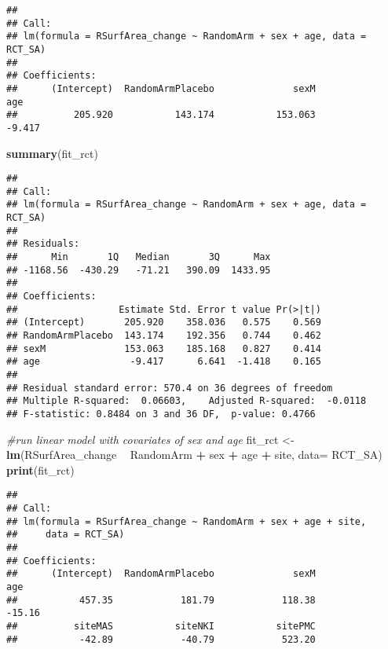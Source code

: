 \documentclass[]{article}
\newenvironment{Shaded}{\begin{snugshade}}{\end{snugshade}}
\newcommand{\KeywordTok}[1]{\textcolor[rgb]{0.13,0.29,0.53}{\textbf{#1}}}
\newcommand{\DataTypeTok}[1]{\textcolor[rgb]{0.13,0.29,0.53}{#1}}
\newcommand{\StringTok}[1]{\textcolor[rgb]{0.31,0.60,0.02}{#1}}
\newcommand{\CommentTok}[1]{\textcolor[rgb]{0.56,0.35,0.01}{\textit{#1}}}
\newcommand{\OperatorTok}[1]{\textcolor[rgb]{0.81,0.36,0.00}{\textbf{#1}}}
\newcommand{\NormalTok}[1]{#1}
\theoremstyle{definition}
\theoremstyle{definition}
\theoremstyle{definition}
\theoremstyle{remark}
\begin{document}
\begin{verbatim}
## 
## Call:
## lm(formula = RSurfArea_change ~ RandomArm + sex + age, data = RCT_SA)
## 
## Coefficients:
##      (Intercept)  RandomArmPlacebo              sexM               age  
##          205.920           143.174           153.063            -9.417
\end{verbatim}

\begin{Shaded}
\begin{Highlighting}[]
  \KeywordTok{summary}\NormalTok{(fit_rct)}
\end{Highlighting}
\end{Shaded}

\begin{verbatim}
## 
## Call:
## lm(formula = RSurfArea_change ~ RandomArm + sex + age, data = RCT_SA)
## 
## Residuals:
##      Min       1Q   Median       3Q      Max 
## -1168.56  -430.29   -71.21   390.09  1433.95 
## 
## Coefficients:
##                  Estimate Std. Error t value Pr(>|t|)
## (Intercept)       205.920    358.036   0.575    0.569
## RandomArmPlacebo  143.174    192.356   0.744    0.462
## sexM              153.063    185.168   0.827    0.414
## age                -9.417      6.641  -1.418    0.165
## 
## Residual standard error: 570.4 on 36 degrees of freedom
## Multiple R-squared:  0.06603,    Adjusted R-squared:  -0.0118 
## F-statistic: 0.8484 on 3 and 36 DF,  p-value: 0.4766
\end{verbatim}

\begin{Shaded}
\begin{Highlighting}[]
\CommentTok{#run linear model with covariates of sex and age}
\NormalTok{  fit_rct <-}\StringTok{ }\KeywordTok{lm}\NormalTok{(RSurfArea_change }\OperatorTok{~}\StringTok{ }\NormalTok{RandomArm }\OperatorTok{+}\StringTok{ }\NormalTok{sex }\OperatorTok{+}\StringTok{ }\NormalTok{age }\OperatorTok{+}\StringTok{ }\NormalTok{site, }\DataTypeTok{data=}\NormalTok{ RCT_SA)}
  \KeywordTok{print}\NormalTok{(fit_rct)}
\end{Highlighting}
\end{Shaded}

\begin{verbatim}
## 
## Call:
## lm(formula = RSurfArea_change ~ RandomArm + sex + age + site, 
##     data = RCT_SA)
## 
## Coefficients:
##      (Intercept)  RandomArmPlacebo              sexM               age  
##           457.35            181.79            118.38            -15.16  
##          siteMAS           siteNKI           sitePMC  
##           -42.89            -40.79            523.20
\end{verbatim}
\end{document}
